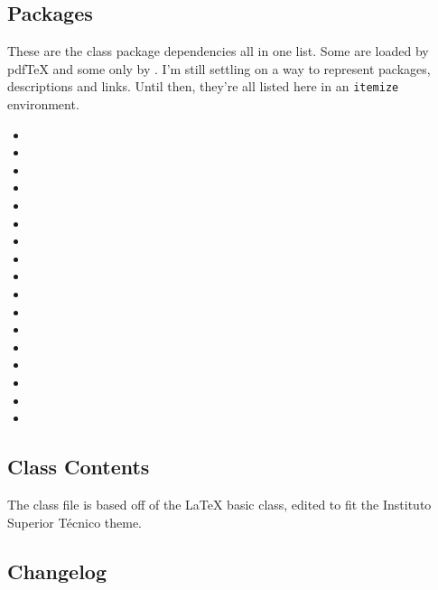 \documentclass[palatino,english]{ist-report}
\begin{document}
\subsection{Packages}

These are the class package dependencies all in one list. Some are loaded by pdf\TeX{} and some only by \XeLaTeX{}. I'm still settling on a way to represent packages, descriptions and links. Until then, they're all listed here in an \texttt{itemize} environment.
\begin{itemize}
	\item {}
	\item {}
	\item {}
	\item {}
	\item {}
	\item {}
	\item {}
	\item {}
	\item {}
	\item {}
	\item {}
	\item {}
	\item {}
	\item {}
	\item {}
	\item {}
	\item {}
\end{itemize}

\subsection{Class Contents}

The class file is based off of the \LaTeX{} basic  class, edited to fit the Instituto Superior Técnico theme.

\subsection{Changelog}
\end{document}
